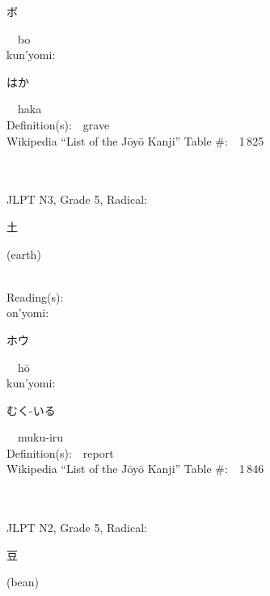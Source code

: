 \begin{multicols}{2}
{\hspace*{2em}}{\begin{CJK}{UTF8}{min} ボ \end{CJK}}\ \ bo\ \ \\
{\hspace*{1em}}kun'yomi:\ \ \\
{\hspace*{2em}}{\begin{CJK}{UTF8}{min} はか \end{CJK}}\ \ haka\ \ \\
Definition(s):\ \ grave \\
Wikipedia ``List of the J\=oy\=o Kanji'' Table \#:\ \ 1\,825 \\
\ \ \\
{\fontsize{34pt}{40pt}  }\ \ \\  %
{JLPT N3, Grade 5, Radical:\ \ {\begin{CJK}{UTF8}{min} 土 \end{CJK}} (earth) } \\
Reading(s):\ \ \\
{\hspace*{1em}}on'yomi:\ \ \\
{\hspace*{2em}}{\begin{CJK}{UTF8}{min} ホウ \end{CJK}}\ \ h\=o\ \ \\
{\hspace*{1em}}kun'yomi:\ \ \\
{\hspace*{2em}}{\begin{CJK}{UTF8}{min} むく-いる \end{CJK}}\ \ muku-iru\ \ \\
Definition(s):\ \ report \\
Wikipedia ``List of the J\=oy\=o Kanji'' Table \#:\ \ 1\,846 \\
\ \ \\
{\fontsize{34pt}{40pt}  }\ \ \\  %
{JLPT N2, Grade 5, Radical:\ \ {\begin{CJK}{UTF8}{min} 豆 \end{CJK}} (bean) } \\

\end{multicols}
